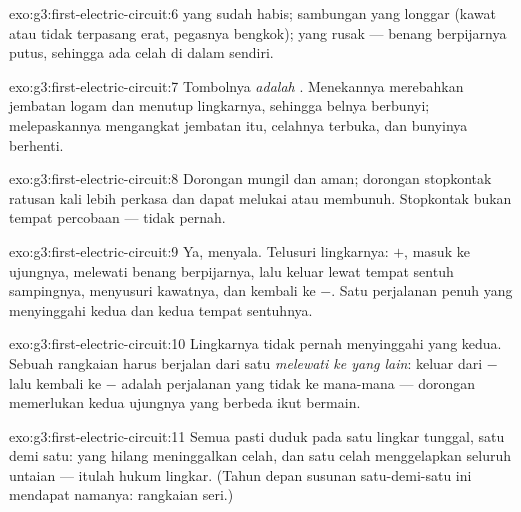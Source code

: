 \begin{solution}{exo:g3:first-electric-circuit:6}
 yang sudah habis; sambungan yang longgar (kawat atau 
tidak terpasang erat, pegasnya bengkok);  yang rusak --- benang
berpijarnya putus, sehingga ada celah di dalam  sendiri.
\end{solution}

\begin{solution}{exo:g3:first-electric-circuit:7}
Tombolnya \emph{adalah} . Menekannya merebahkan jembatan
logam dan menutup lingkarnya, sehingga belnya berbunyi; melepaskannya
mengangkat jembatan itu, celahnya terbuka, dan bunyinya berhenti.
\end{solution}

\begin{solution}{exo:g3:first-electric-circuit:8}
Dorongan  mungil dan aman; dorongan stopkontak ratusan kali
lebih perkasa dan dapat melukai atau membunuh. Stopkontak bukan tempat
percobaan --- tidak pernah.
\end{solution}

\begin{solution}{exo:g3:first-electric-circuit:9}
Ya,  menyala. Telusuri lingkarnya:  $+$, masuk ke
ujungnya, melewati benang berpijarnya, lalu keluar lewat tempat
sentuh sampingnya, menyusuri kawatnya, dan kembali ke $-$. Satu perjalanan penuh
yang menyinggahi kedua  dan kedua tempat sentuhnya.
\end{solution}

\begin{solution}{exo:g3:first-electric-circuit:10}
Lingkarnya tidak pernah menyinggahi  yang kedua. Sebuah rangkaian
harus berjalan dari satu  \emph{melewati  ke  yang
lain}: keluar dari $-$ lalu kembali ke $-$ adalah perjalanan yang
tidak ke mana-mana --- dorongan  memerlukan kedua ujungnya yang
berbeda ikut bermain.
\end{solution}

\begin{solution}{exo:g3:first-electric-circuit:11}
Semua  pasti duduk pada satu lingkar tunggal, satu demi satu:
 yang hilang meninggalkan celah, dan satu celah menggelapkan
seluruh untaian --- itulah hukum lingkar. (Tahun depan susunan
satu-demi-satu ini mendapat namanya: rangkaian seri.)
\end{solution}
